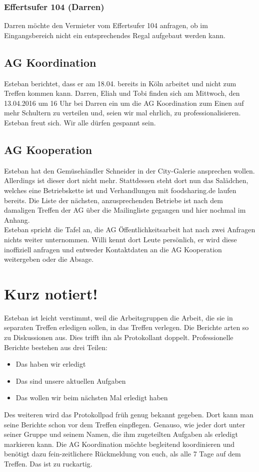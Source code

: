 \documentclass{scrreprt}
\begin{document}
{\subsection{Effertsufer 104 (Darren)}
Darren möchte den Vermieter vom Effertsufer 104 anfragen, ob im Eingangsbereich nicht ein entsprechendes Regal aufgebaut werden kann.

\section{AG Koordination}
Esteban berichtet, dass er am 18.04. bereits in Köln arbeitet und nicht zum Treffen kommen kann. Darren, Eliah und Tobi finden sich am Mittwoch, den 13.04.2016 um 16 Uhr bei Darren ein um die AG Koordination zum Einen auf mehr Schultern zu verteilen und, seien wir mal ehrlich, zu professionalisieren. Esteban freut sich. Wir alle dürfen gespannt sein.

\section{AG Kooperation}
Esteban hat den Gemüsehändler Schneider in der City-Galerie ansprechen wollen. Allerdings ist dieser dort nicht mehr. Stattdessen steht dort nun das Salädchen, welches eine Betriebskette ist und Verhandlungen mit foodsharing.de laufen bereits. Die Liste der nächsten, anzusprechenden Betriebe ist nach dem damaligen Treffen der AG über die Mailingliste gegangen und hier nochmal im Anhang.\\
Esteban spricht die Tafel an, die AG Öffentlichkeitsarbeit hat nach zwei Anfragen nichts weiter unternommen. Willi kennt dort Leute persönlich, er wird diese inoffiziell anfragen und entweder Kontaktdaten an die AG Kooperation weitergeben oder die Absage.

\chapter{Kurz notiert!}
Esteban ist leicht verstimmt, weil die Arbeitsgruppen die Arbeit, die sie in separaten Treffen erledigen sollen, in das Treffen verlegen. Die Berichte arten so zu Diskussionen aus. Dies trifft ihn als Protokollant doppelt. Professionelle Berichte bestehen aus drei Teilen:
\begin{itemize}
\item Das haben wir erledigt
\item Das sind unsere aktuellen Aufgaben
\item Das wollen wir beim nächsten Mal erledigt haben
\end{itemize}
Des weiteren wird das Protokollpad früh genug bekannt gegeben. Dort kann man seine Berichte schon vor dem Treffen einpflegen. Genauso, wie jeder dort unter seiner Gruppe und seinem Namen, die ihm zugeteilten Aufgaben als erledigt markieren kann. Die AG Koordination möchte begleitend koordinieren und benötigt dazu fein-zeitlichere Rückmeldung von euch, als alle 7 Tage auf dem Treffen. Das ist zu ruckartig.
}
\end{document}
